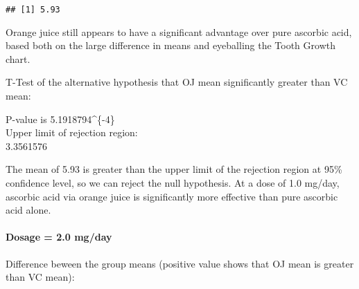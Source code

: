 \documentclass[]{article}
\newenvironment{Shaded}{\begin{snugshade}}{\end{snugshade}}
\newcommand{\KeywordTok}[1]{\textcolor[rgb]{0.13,0.29,0.53}{\textbf{#1}}}
\newcommand{\DataTypeTok}[1]{\textcolor[rgb]{0.13,0.29,0.53}{#1}}
\newcommand{\FloatTok}[1]{\textcolor[rgb]{0.00,0.00,0.81}{#1}}
\newcommand{\StringTok}[1]{\textcolor[rgb]{0.31,0.60,0.02}{#1}}
\newcommand{\OperatorTok}[1]{\textcolor[rgb]{0.81,0.36,0.00}{\textbf{#1}}}
\newcommand{\NormalTok}[1]{#1}
\let\oldparagraph\paragraph
\renewcommand{\paragraph}[1]{\oldparagraph{#1}\mbox{}}
\begin{document}
\begin{verbatim}
## [1] 5.93
\end{verbatim}

Orange juice still appears to have a significant advantage over pure
ascorbic acid, based both on the large difference in means and
eyeballing the Tooth Growth chart.

T-Test of the alternative hypothesis that OJ mean significantly greater
than VC mean:

\begin{Shaded}
\end{Shaded}

P-value is 5.1918794\^{}\{-4\}\\
Upper limit of rejection region:\\
3.3561576

The mean of 5.93 is greater than the upper limit of the rejection region
at 95\% confidence level, so we can reject the null hypothesis. At a
dose of 1.0 mg/day, ascorbic acid via orange juice is significantly more
effective than pure ascorbic acid alone.

\paragraph{Dosage = 2.0 mg/day}\label{dosage-2.0-mgday}

Difference beween the group means (positive value shows that OJ mean is
greater than VC mean):

\begin{Shaded}
\end{Shaded}
\end{document}

